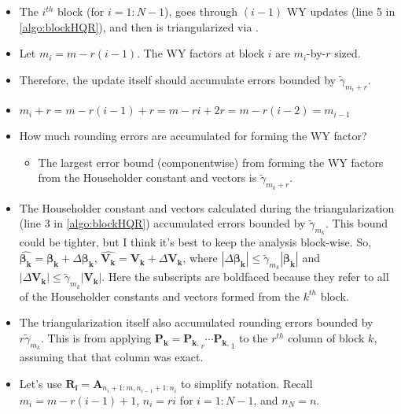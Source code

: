 \documentclass[review,onefignum,onetabnum]{siamart190516}
\newcommand{\bb}[1]{\mathbf{#1}}
\begin{document}
\begin{itemize}
	\item The $i^{th}$ block (for $i=1:N-1$), goes through $(i-1)$ WY updates (line 5 in \cref{algo:blockHQR}), and then is triangularized via .  
	\item Let $m_i = m-r(i-1)$. The WY factors at block $i$ are $m_i$-by-$r$ sized.
	\item Therefore, the update itself should accumulate errors bounded by $\tilde{\gamma}_{m_i+r}$.
	\item $m_i+r = m-r(i-1) +r = m-ri + 2r = m-r(i-2)=m_{i-1}$
	\item How much rounding errors are accumulated for forming the WY factor? 
	\begin{itemize}
		\item The largest error bound (componentwise) from forming the WY factors from the Householder constant and vectors is $\tilde{\gamma}_{m_k+r}$.
	\end{itemize}
	\item The Householder constant and vectors calculated during the triangularization (line 3 in \cref{algo:blockHQR}) accumulated errors bounded by $\tilde{\gamma}_{m_k}$. This bound could be tighter, but I think it's best to keep the analysis block-wise. So, $\hat{\bm{\beta_k}} = \bm{\beta_k} + \Delta \bm{\beta_k}$, $\hat{\bb{V_k}}=\bb{V_k}+\Delta\bb{V_k}$, where $|\Delta \bm{\beta_k}|\leq \tilde{\gamma}_{m_k} |\bm{\beta_k}|$ and $|\Delta\bb{V_k}|\leq\tilde{\gamma}_{m_k}|\bb{V_k}|$. Here the subscripts are boldfaced because they refer to all of the Householder constants and vectors formed from the $k^{th}$ block.
	\item The triangularization itself also accumulated rounding errors bounded by $r\tilde{\gamma}_{m_k}$. This is from applying  $\bb{P_k}=\bb{P_{k,}}_r\cdots\bb{P_{k,}}_1$ to the $r^{th}$ column of block $k$, assuming that that column was exact.
	\item Let's use $\bb{R_i} = \bb{A}_{n_i+1:m, n_{i-1}+1:n_i}$ to simplify notation. Recall $m_i=m- r(i-1)+1$, $n_i=ri$ for $i=1:N-1$, and $n_N=n$.
\end{itemize}
\end{document}
